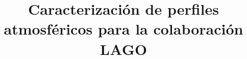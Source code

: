 \documentclass[letter,oneside,12pt,spanish]{report}          %
\begin{document}
\title{Caracterización de perfiles atmosféricos para la colaboración LAGO}
\tableofcontents                                      %
\listoffigures                         %
\listoftables
\listofanexo
  
 
   
\newpage
\noindent
%
\printbibliography
   
   

\end{document}

